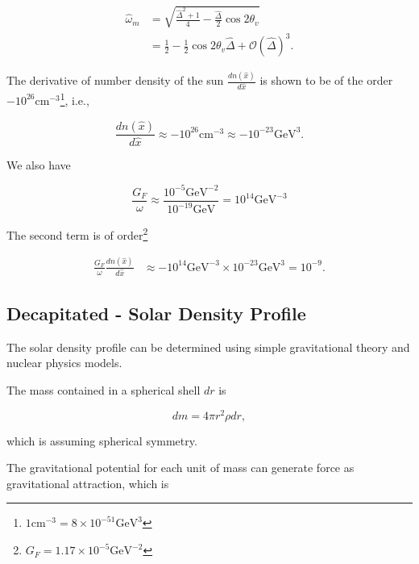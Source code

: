 \documentclass{tufte-handout}
\begin{document}
\begin{align*}
\hat \omega_m & = \sqrt{\frac{\hat\Delta ^2 + 1}{4} - \frac{\hat\Delta}{2}\cos 2\theta_v } \\
& = \frac{1}{2} - \frac{1}{2}\cos 2\theta_v \hat\Delta + \mathcal{O}(\hat\Delta)^3.
\end{align*}




The derivative of number density of the sun $\frac{d n(\hat x)}{d\hat x}$ is shown to be of the order $-10^{26} \mathrm{cm^{-3}}$\footnote{$1\mathrm{cm^{-3}} = 8\times 10^{-51}\mathrm{GeV^3} $ }, i.e.,

\begin{equation*}
\frac{d n(\hat x)}{d\hat x} \approx -10^{26} \mathrm{cm^{-3}} \approx -10^{-23} \mathrm{GeV^3}.
\end{equation*}

We also have

\begin{equation*}
\frac{G_F}{\omega} \approx \frac{10^{-5}\mathrm{GeV^{-2}}}{10^{-19}\mathrm{GeV}} = 10^{14} \mathrm{GeV^{-3}}
\end{equation*}


The second term is of order\footnote{$G_F=1.17\times 10^{-5}\mathrm{GeV^{-2}}$}

\begin{align*}
\frac{G_F}{\omega} \frac{d n(\hat x)}{d\hat x} & \approx - 10^{14}\mathrm{GeV^{-3}} \times 10^{-23} \mathrm{GeV^3} = 10^{-9}. 
\end{align*}






\subsection{Decapitated - Solar Density Profile}



The solar density profile can be determined using simple gravitational theory and nuclear physics models.

The mass contained in a spherical shell $dr$ is

\begin{equation}
    dm = 4\pi r^2 \rho dr ,
\end{equation}

which is assuming spherical symmetry.

The gravitational potential for each unit of mass can generate force as gravitational attraction, which is
\end{document}
